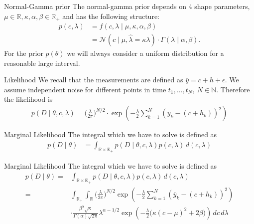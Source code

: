 \documentclass{beamer}
\newcommand{\R}{\mathbb{R}}
\begin{document}
  	\begin{frame}{Normal-Gamma prior}
  		The normal-gamma prior depends on 4 shape parameters, $\mu \in \R, \kappa,
  		\alpha, \beta \in \R_+$ and has the following structure:
  		\begin{align*}
  			p(c, \lambda) &= f(c, \lambda \mid \mu, \kappa, \alpha, \beta) \\
  			&= \mathcal{N}(c \mid \mu, \hat{\lambda} = \kappa \lambda) \cdot 
  			\Gamma(\lambda \mid \alpha, \beta).
  		\end{align*}
  		For the prior $p(\theta)$ we will always consider a uniform distribution
  		for a reasonable large interval.
  		
  	\end{frame}
  	
  	\begin{frame}{Likelihood}
  		We recall that the measurements are defined as $\overline{y} = c + h +
  		\epsilon$. We assume independent noise for different points in time $t_1, 
  		\ldots, t_N, \ N \in \mathbb{N}$. Therefore the likelihood is
  		\begin{align*}
  			 p(D \mid \theta, c, \lambda) = \biggl(\frac{\lambda}{2\pi}\biggr) 
  			 ^{N/2} \cdot \exp\left( - \frac{\lambda}{2} \sum_{k = 1}^N 
  			 (\overline{y}_k - (c + h_k))^2 \right)
  		\end{align*}
  	\end{frame}
  	
	\begin{frame}{Marginal Likelihood}
  		The integral which we have to solve is defined as
  		\begin{align*}
    		p(D \mid \theta) &= \int_{\R \times \R_+} p(D \mid \theta,c,\lambda) 				p(c, \lambda) \, d(c, \lambda)
		\end{align*}
  	\end{frame}  	
  	
  	\begin{frame}[noframenumbering]{Marginal Likelihood}
  		The integral which we have to solve is defined as
  		\begin{align*}
    		p(D \mid \theta) =& \int_{\R \times \R_+} p(D \mid \theta,c,\lambda) 				p(c, \lambda) \, d(c, \lambda) \\
    		=& \int_{\R_+} \int_\R \biggl(\frac{\lambda}{2\pi}\biggr)^{N/2} \exp				\left( - \frac{\lambda}{2} \sum_{k = 1}^N (\overline{y}_k - (c +
    		h_k))^2 \right) \\
    		&\cdot \frac{\beta^\alpha \sqrt{\kappa}}{\Gamma(\alpha)\sqrt{2\pi}} 				\lambda^{\alpha-1/2} \exp\left(- \frac{\lambda}{2} \bigl(\kappa (c - 
    		\mu)^2 + 2\beta\bigr) \right) \, dc \, d\lambda
		\end{align*}
  	\end{frame}
  	
\end{document}
